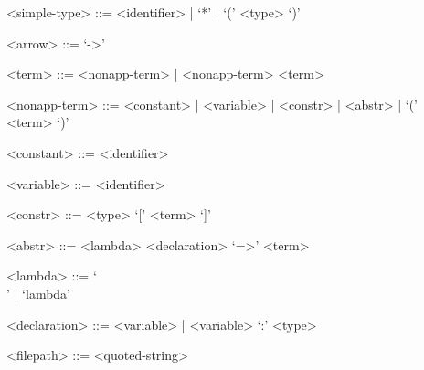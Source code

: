 \documentclass[main.tex]{subfiles}
\begin{document}
\begin{grammar}
    <simple-type> ::= <identifier> | `*' | `(' <type> `)'

    <arrow> ::= `->'

    <term> ::= <nonapp-term> | <nonapp-term> <term>

    <nonapp-term> ::= <constant> | <variable> | <constr> | <abstr> | `(' <term> `)'

    <constant> ::= <identifier>

    <variable> ::= <identifier>

    <constr> ::= <type> `[' <term> `]'

    <abstr> ::= <lambda> <declaration> `=>' <term>

    <lambda> ::= `\\' | `lambda'

    <declaration> ::= <variable> | <variable> `:' <type>

    <filepath> ::= <quoted-string>
\end{grammar}
\end{document}

